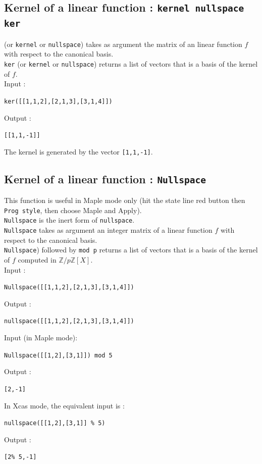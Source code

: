 \documentclass[a4paper,11pt]{book}
\begin{document}
\subsection{Kernel of a linear function : {\tt kernel nullspace ker}}
 (or {\tt kernel} or {\tt nullspace}) takes as argument the 
matrix of an linear function $f$ with respect to the canonical basis.\\
{\tt ker} (or {\tt kernel} or  {\tt nullspace}) returns a list of
vectors that is a basis of the kernel of $f$.\\
Input :
\begin{center}{\tt ker([[1,1,2],[2,1,3],[3,1,4]])}\end{center}
Output :
\begin{center}{\tt [[1,1,-1]]}\end{center}
The kernel is generated by the vector {\tt [1,1,-1]}.

\subsection{Kernel of a linear function : {\tt Nullspace}}
 This function is useful in Maple mode only 
(hit the state line red button then {\tt Prog style}, 
then choose Maple and Apply).\\
{\tt Nullspace} is the inert form of {\tt nullspace}.\\
{\tt Nullspace} takes as argument an integer matrix of a linear 
function $f$ with respect to the canonical basis.\\
{\tt Nullspace}) followed by {\tt mod p} returns a list of vectors 
that is a basis of the kernel of $f$ computed in $\mathbb Z/p\mathbb Z[X]$.\\
Input :
\begin{center}{\tt Nullspace([[1,1,2],[2,1,3],[3,1,4]])}\end{center}
Output :
\begin{center}{\tt nullspace([[1,1,2],[2,1,3],[3,1,4]])}\end{center}
Input (in Maple mode):
\begin{center}{\tt Nullspace([[1,2],[3,1]]) mod 5}\end{center}
Output :
\begin{center}{\tt [2,-1]}\end{center}
In Xcas mode, the equivalent input is :
\begin{center}{\tt nullspace([[1,2],[3,1]] \% 5)}\end{center}
Output :
\begin{center}{\tt [2\% 5,-1]}\end{center}
\end{document}
